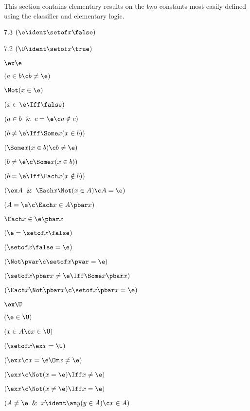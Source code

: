 
This section contains elementary results on the two constants most easily
defined using the classifier and elementary logic.


\noindent{}7.3 $(\e \ident \setof x \false)$

\noindent{}7.2 $(\U \ident \setof x \true)$


 $\ex \e$

 $(a \in b \c b \ne \e)$

 $\Not(x \in \e)$

 $(x \in \e \Iff \false)$

 $(a \in b \And c = \e \c a \notin c)$

 $(b \ne \e \Iff \Some x (x \in b))$

 $(\Some x (x \in b)\c b \ne \e )$

 $(b \ne \e \c \Some x (x \in b))$

 $(b = \e \Iff \Each x (x \notin b))$

 $(\ex A \And \Each x \Not(x \in A)\c A= \e)$

 $(A = \e \c \Each x \in A \pbar x)$

 $\Each x \in \e \pbar x$

 $(\e = \setof x \false)$

 $(\setof x \false = \e)$

 $(\Not\pvar \c \setof x \pvar  = \e)$

 $(\setof x \pbar x \ne \e \Iff \Some x \pbar x)$

 $(\Each x \Not\pbar x \c \setof x \pbar x = \e)$

 $\ex \U$

 $(\e \in \U)$

 $(x \in A \c x \in \U)$

 $(\setof x \ex x = \U)$

 $(\ex x \c x = \e \Or x \ne \e)$

 $(\ex x \c \Not (x = \e) \Iff x \ne \e)$

 $(\ex x \c \Not (x \ne \e) \Iff x = \e)$

 $(A \ne \e \And x \ident \an y(y\in A)\c x\in A)$

